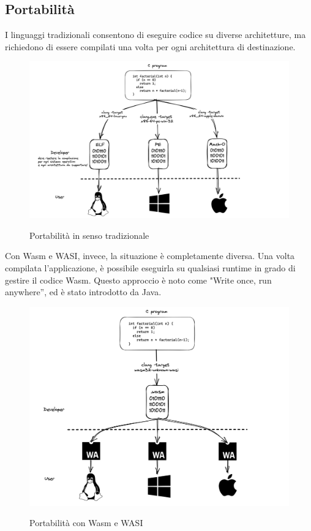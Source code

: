 \subsection{Portabilità}
I linguaggi tradizionali consentono di eseguire codice su diverse architetture, ma richiedono di essere compilati una
volta per ogni architettura di destinazione.
\begin{figure}[H]
    \centering
    \captionsetup{justification=centering}
    \includegraphics[width=15cm]{./images/6.c_compilation_portability.png}
    \label{traditional_programming_portability}
    \caption{Portabilità in senso tradizionale}
\end{figure}
Con Wasm e WASI, invece, la situazione è completamente diversa. Una volta compilata l'applicazione, è possibile
eseguirla su qualsiasi runtime in grado di gestire il codice Wasm. Questo approccio è noto come "Write once, run
anywhere”, ed è stato introdotto da Java.
\begin{figure}[H]
    \centering
    \captionsetup{justification=centering}
    \includegraphics[width=15cm]{./images/6.wasm_compilation_portability.png}
    \label{wasm_wasi_programming_portability}
    \caption{Portabilità con Wasm e WASI}
\end{figure}
